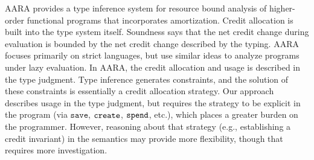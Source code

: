 AARA provides a type inference system for resource bound analysis of
higher-order functional programs that incorporates amortization.  Credit
allocation is built into the type system itself.
Soundness says that the
net credit change during evaluation is bounded by the net credit change
described by the typing.  AARA focuses primarily on strict languages, but
\citet{jost-et-al:jar17} use similar ideas to analyze programs
under lazy evaluation.
In AARA, the credit allocation and usage is described
in the type judgment.
Type inference generates constraints, and the solution of these constraints
is essentially a credit allocation strategy.  
Our approach describes usage in the type judgment, but
requires the strategy to be explicit in the program (via 
$\texttt{save}$, $\texttt{create}$, $\texttt{spend}$, etc.), which
places a greater burden on the programmer.  However, reasoning about that
strategy (e.g., establishing a credit invariant) in the semantics may
provide more flexibility, though that requires more investigation.


